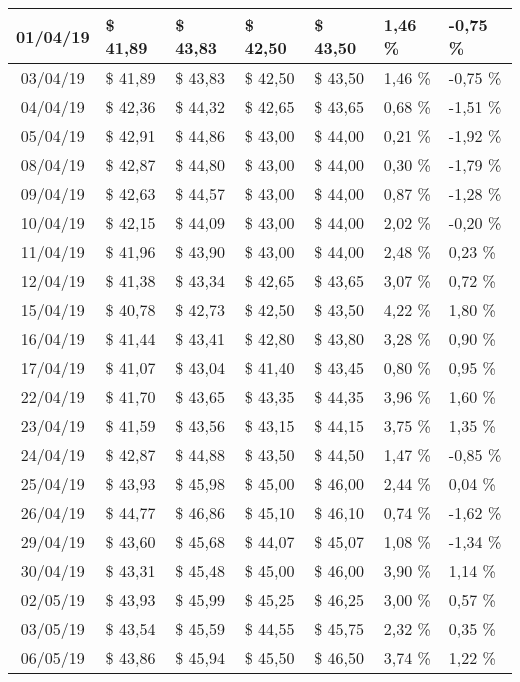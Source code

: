 \begin{center}
\begin{longtable}{|c|p{1.5cm}|p{1.5cm}|p{1.5cm}|p{1.5cm}|p{1.5cm}|p{1.5cm}|}
01/04/19 & \$ 41,89 & \$ 43,83 & \$ 42,50 & \$ 43,50 & 1,46 \% & -0,75 \% \\ \hline
03/04/19 & \$ 41,89 & \$ 43,83 & \$ 42,50 & \$ 43,50 & 1,46 \% & -0,75 \% \\ \hline
04/04/19 & \$ 42,36 & \$ 44,32 & \$ 42,65 & \$ 43,65 & 0,68 \% & -1,51 \% \\ \hline
05/04/19 & \$ 42,91 & \$ 44,86 & \$ 43,00 & \$ 44,00 & 0,21 \% & -1,92 \% \\ \hline
08/04/19 & \$ 42,87 & \$ 44,80 & \$ 43,00 & \$ 44,00 & 0,30 \% & -1,79 \% \\ \hline
09/04/19 & \$ 42,63 & \$ 44,57 & \$ 43,00 & \$ 44,00 & 0,87 \% & -1,28 \% \\ \hline
10/04/19 & \$ 42,15 & \$ 44,09 & \$ 43,00 & \$ 44,00 & 2,02 \% & -0,20 \% \\ \hline
11/04/19 & \$ 41,96 & \$ 43,90 & \$ 43,00 & \$ 44,00 & 2,48 \% & 0,23 \% \\ \hline
12/04/19 & \$ 41,38 & \$ 43,34 & \$ 42,65 & \$ 43,65 & 3,07 \% & 0,72 \% \\ \hline
15/04/19 & \$ 40,78 & \$ 42,73 & \$ 42,50 & \$ 43,50 & 4,22 \% & 1,80 \% \\ \hline
16/04/19 & \$ 41,44 & \$ 43,41 & \$ 42,80 & \$ 43,80 & 3,28 \% & 0,90 \% \\ \hline
17/04/19 & \$ 41,07 & \$ 43,04 & \$ 41,40 & \$ 43,45 & 0,80 \% & 0,95 \% \\ \hline
22/04/19 & \$ 41,70 & \$ 43,65 & \$ 43,35 & \$ 44,35 & 3,96 \% & 1,60 \% \\ \hline
23/04/19 & \$ 41,59 & \$ 43,56 & \$ 43,15 & \$ 44,15 & 3,75 \% & 1,35 \% \\ \hline
24/04/19 & \$ 42,87 & \$ 44,88 & \$ 43,50 & \$ 44,50 & 1,47 \% & -0,85 \% \\ \hline
25/04/19 & \$ 43,93 & \$ 45,98 & \$ 45,00 & \$ 46,00 & 2,44 \% & 0,04 \% \\ \hline
26/04/19 & \$ 44,77 & \$ 46,86 & \$ 45,10 & \$ 46,10 & 0,74 \% & -1,62 \% \\ \hline
29/04/19 & \$ 43,60 & \$ 45,68 & \$ 44,07 & \$ 45,07 & 1,08 \% & -1,34 \% \\ \hline
30/04/19 & \$ 43,31 & \$ 45,48 & \$ 45,00 & \$ 46,00 & 3,90 \% & 1,14 \% \\ \hline
02/05/19 & \$ 43,93 & \$ 45,99 & \$ 45,25 & \$ 46,25 & 3,00 \% & 0,57 \% \\ \hline
03/05/19 & \$ 43,54 & \$ 45,59 & \$ 44,55 & \$ 45,75 & 2,32 \% & 0,35 \% \\ \hline
06/05/19 & \$ 43,86 & \$ 45,94 & \$ 45,50 & \$ 46,50 & 3,74 \% & 1,22 \% \\ \hline

\end{longtable}
\end{center}
